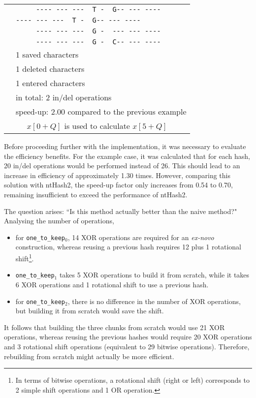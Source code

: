 \begin{example}
	\begin{center}
		\begin{tabular}{c | l}
			\multirow{9}{*}{\rotatebox[origin=c]{90}{$\texttt{one\_to\_keep}_2$}}
			& \verb|     ---- --- ---  T -  G-- --- ----| \\
			& \verb|---- --- ---  T -  G-- --- ----     | \\
			& \verb|     ---- --- ---  G -  --- --- ----| \\
			& \verb|     ---- --- ---  G -  C-- --- ----| \\
			\cline{2-2}
			& 1 saved characters \\
			& 1 deleted characters \\
			& 1 entered characters \\
			\cline{2-2}
			& in total: 2 in/del operations \\%
			& speed-up: 2.00 compared to the previous example \\
			\bottomrule
			\multicolumn{2}{c}{$x[0 + Q]$ is used to calculate $x[5 + Q]$} \\
		\end{tabular}
	\end{center}
\end{example}

Before proceeding further with the implementation, it was necessary to evaluate the efficiency benefits. For the example case, it was calculated that for each hash, 20 in/del operations would be performed instead of 26. This should lead to an increase in efficiency of approximately 1.30 times. However, comparing this solution with ntHash2, the speed-up factor only increases from 0.54 to 0.70, remaining insufficient to exceed the performance of ntHash2.

The question arises: “Is this method actually better than the naive method?" Analysing the number of operations,
\begin{itemize}
	\item for \verb|one_to_keep|$_0$, 14 XOR operations are required for an \emph{ex-novo} construction, whereas reusing a previous hash requires 12 plus 1 rotational shift\footnote{In terms of bitwise operations, a rotational shift (right or left) corresponds to 2 simple shift operations and 1 OR operation.}.
	\item \verb|one_to_keep|$_1$ takes 5 XOR operations to build it from scratch, while it takes 6 XOR operations and 1 rotational shift to use a previous hash.
	\item for \verb|one_to_keep|$_2$, there is no difference in the number of XOR operations, but building it from scratch would save the shift.
\end{itemize}
It follows that building the three chunks from scratch would use 21 XOR operations, whereas reusing the previous hashes would require 20 XOR operations and 3 rotational shift operations (equivalent to 29 bitwise operations). Therefore, rebuilding from scratch might actually be more efficient.



